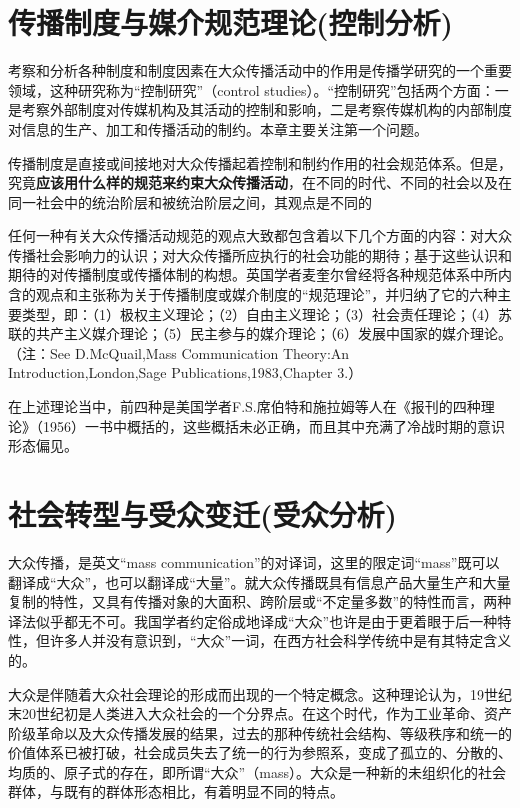 \documentclass[UTF8,12pt]{ctexart}
\numberwithin{equation}{section} %
\numberwithin{figure}{section}
\numberwithin{table}{section}
\begin{document}
	\newpage
	
	\section{传播制度与媒介规范理论(控制分析)}
	考察和分析各种制度和制度因素在大众传播活动中的作用是传播学研究的一个重要领域，这种研究称为“控制研究”（control studies）。“控制研究”包括两个方面：一是考察外部制度对传媒机构及其活动的控制和影响，二是考察传媒机构的内部制度对信息的生产、加工和传播活动的制约。本章主要关注第一个问题。
	
	传播制度是直接或间接地对大众传播起着控制和制约作用的社会规范体系。但是，究竟\textbf{应该用什么样的规范来约束大众传播活动}，在不同的时代、不同的社会以及在同一社会中的统治阶层和被统治阶层之间，其观点是不同的
	
	任何一种有关大众传播活动规范的观点大致都包含着以下几个方面的内容：对大众传播社会影响力的认识；对大众传播所应执行的社会功能的期待；基于这些认识和期待的对传播制度或传播体制的构想。英国学者麦奎尔曾经将各种规范体系中所内含的观点和主张称为关于传播制度或媒介制度的“规范理论”，并归纳了它的六种主要类型，即：（1）极权主义理论；（2）自由主义理论；（3）社会责任理论；（4）苏联的共产主义媒介理论；（5）民主参与的媒介理论；（6）发展中国家的媒介理论。（注：See D.McQuail,Mass Communication Theory:An Introduction,London,Sage Publications,1983,Chapter 3.）
	
	在上述理论当中，前四种是美国学者F.S.席伯特和施拉姆等人在《报刊的四种理论》（1956）一书中概括的，这些概括未必正确，而且其中充满了冷战时期的意识形态偏见。
	
	\newpage
	
	\section{社会转型与受众变迁(受众分析)}
	
	大众传播，是英文“mass communication”的对译词，这里的限定词“mass”既可以翻译成“大众”，也可以翻译成“大量”。就大众传播既具有信息产品大量生产和大量复制的特性，又具有传播对象的大面积、跨阶层或“不定量多数”的特性而言，两种译法似乎都无不可。我国学者约定俗成地译成“大众”也许是由于更着眼于后一种特性，但许多人并没有意识到，“大众”一词，在西方社会科学传统中是有其特定含义的。
	
	大众是伴随着大众社会理论的形成而出现的一个特定概念。这种理论认为，19世纪末20世纪初是人类进入大众社会的一个分界点。在这个时代，作为工业革命、资产阶级革命以及大众传播发展的结果，过去的那种传统社会结构、等级秩序和统一的价值体系已被打破，社会成员失去了统一的行为参照系，变成了孤立的、分散的、均质的、原子式的存在，即所谓“大众”（mass）。大众是一种新的未组织化的社会群体，与既有的群体形态相比，有着明显不同的特点。
	
\end{document}
